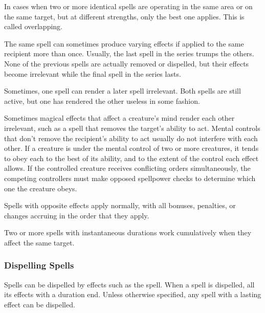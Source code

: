              In cases when two or more identical spells are operating in the same area or on the same target, but at different strengths, only the best one applies.
            This is called overlapping.

             The same spell can sometimes produce varying effects if applied to the same recipient more than once.
            Usually, the last spell in the series trumps the others.
            None of the previous spells are actually removed or dispelled, but their effects become irrelevant while the final spell in the series lasts.

             Sometimes, one spell can render a later spell irrelevant.
            Both spells are still active, but one has rendered the other useless in some fashion.

             Sometimes magical effects that affect a creature's mind render each other irrelevant, such as a spell that removes the target's ability to act.
            Mental controls that don't remove the recipient's ability to act usually do not interfere with each other.
            If a creature is under the mental control of two or more creatures, it tends to obey each to the best of its ability, and to the extent of the control each effect allows.
            If the controlled creature receives conflicting orders simultaneously, the competing controllers must make opposed spellpower checks to determine which one the creature obeys.

             Spells with opposite effects apply normally, with all bonuses, penalties, or changes accruing in the order that they apply.

             Two or more spells with instantaneous durations work cumulatively when they affect the same target.

        \subsubsection{Dispelling Spells}\label{Dispelling Spells}
            Spells can be dispelled by effects such as the  spell.
            When a spell is dispelled, all its effects with a duration end.
            Unless otherwise specified, any spell with a lasting effect can be dispelled.

